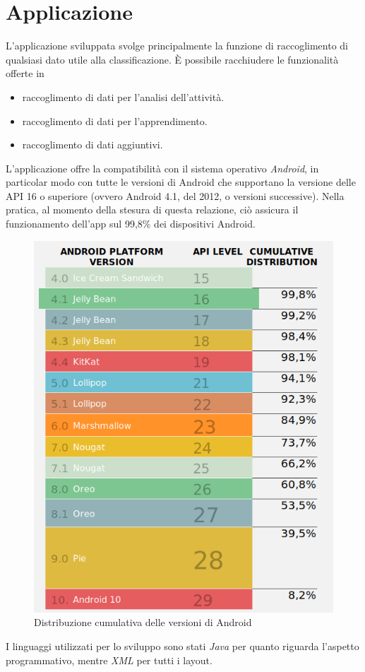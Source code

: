 \chapter{Applicazione}
L'applicazione sviluppata svolge principalmente la funzione di raccoglimento di qualsiasi dato utile alla classificazione.
È possibile racchiudere le funzionalità offerte in
\begin{itemize}
    \item raccoglimento di dati per l'analisi dell'attività.
    \item raccoglimento di dati per l'apprendimento.
    \item raccoglimento di dati aggiuntivi.
\end{itemize}
L'applicazione offre la compatibilità con il sistema operativo \textit{Android}, in particolar modo con tutte le versioni di Android che supportano la 
versione delle API 16 o superiore (ovvero Android 4.1, del 2012, o versioni successive). 
Nella pratica, al momento della stesura di questa relazione, ciò assicura il funzionamento dell'app sul 99,8\% dei dispositivi Android.
\begin{figure}[H]
    \centering
    \includegraphics[scale = 0.45]{assets/images/android/compatibility.png}
    \caption{Distribuzione cumulativa delle versioni di Android}
    \label{fig:android-compatibility}
\end{figure}
I linguaggi utilizzati per lo sviluppo sono stati \textit{Java} per quanto riguarda l'aspetto programmativo, mentre \textit{XML} per tutti i
layout.



